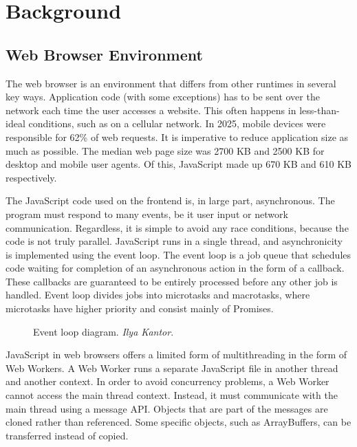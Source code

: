 \chapter{Background}
\label{chap:background}

\section{Web Browser Environment}

The web browser is an environment that differs from other runtimes in several key ways. Application code (with some exceptions) has to be sent over the network each time the user accesses a website. This often happens in less-than-ideal conditions, such as on a cellular network. In 2025, mobile devices were responsible for 62\% of web requests\cite{statcounter_platform_share}. It is imperative to reduce application size as much as possible. The median web page size was 2700 KB and 2500 KB for desktop and mobile user agents. Of this, JavaScript made up 670 KB and 610 KB respectively\cite{httparchive_page_weight_2025}.

The JavaScript code used on the frontend is, in large part, asynchronous. The program must respond to many events, be it user input or network communication. Regardless, it is simple to avoid any race conditions, because the code is not truly parallel. JavaScript runs in a single thread, and asynchronicity is implemented using the event loop. The event loop is a job queue that schedules code waiting for completion of an asynchronous action in the form of a callback. These callbacks are guaranteed to be entirely processed before any other job is handled. Event loop divides jobs into microtasks and macrotasks, where microtasks have higher priority and consist mainly of Promises.

\begin{figure}[h!]
  \centering
  
  \caption{Event loop diagram. \emph{Ilya Kantor}. \protect\footnotemark}
  \label{fig:event-loop}
\end{figure}


JavaScript in web browsers offers a limited form of multithreading in the form of Web Workers. A Web Worker runs a separate JavaScript file in another thread and another context. In order to avoid concurrency problems, a Web Worker cannot access the main thread context. Instead, it must communicate with the main thread using a message API. Objects that are part of the messages are cloned rather than referenced. Some specific objects, such as ArrayBuffers, can be transferred instead of copied.

